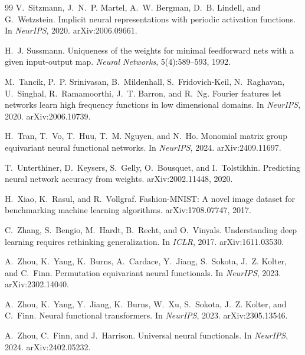 \documentclass[10pt,twocolumn,letterpaper]{article}
\theoremstyle{definition}
\begin{document}
\begin{thebibliography}{99}
V.~Sitzmann, J.~N.~P. Martel, A.~W. Bergman, D.~B. Lindell, and G.~Wetzstein.
\newblock Implicit neural representations with periodic activation functions.
\newblock In \emph{NeurIPS}, 2020. arXiv:2006.09661.

H.~J. Sussmann.
\newblock Uniqueness of the weights for minimal feedforward nets with a given input-output map.
\newblock \emph{Neural Networks}, 5(4):589--593, 1992.

M.~Tancik, P.~P. Srinivasan, B.~Mildenhall, S.~Fridovich-Keil, N.~Raghavan, U.~Singhal,
R.~Ramamoorthi, J.~T. Barron, and R.~Ng.
\newblock Fourier features let networks learn high frequency functions in low dimensional domains.
\newblock In \emph{NeurIPS}, 2020. arXiv:2006.10739.

H.~Tran, T.~Vo, T.~Huu, T.~M. Nguyen, and N.~Ho.
\newblock Monomial matrix group equivariant neural functional networks.
\newblock In \emph{NeurIPS}, 2024. arXiv:2409.11697.

T.~Unterthiner, D.~Keysers, S.~Gelly, O.~Bousquet, and I.~Tolstikhin.
\newblock Predicting neural network accuracy from weights.
\newblock arXiv:2002.11448, 2020.

H.~Xiao, K.~Rasul, and R.~Vollgraf.
\newblock Fashion-MNIST: A novel image dataset for benchmarking machine learning algorithms.
\newblock arXiv:1708.07747, 2017.

C.~Zhang, S.~Bengio, M.~Hardt, B.~Recht, and O.~Vinyals.
\newblock Understanding deep learning requires rethinking generalization.
\newblock In \emph{ICLR}, 2017. arXiv:1611.03530.

A.~Zhou, K.~Yang, K.~Burns, A.~Cardace, Y.~Jiang, S.~Sokota, J.~Z. Kolter, and C.~Finn.
\newblock Permutation equivariant neural functionals.
\newblock In \emph{NeurIPS}, 2023. arXiv:2302.14040.

A.~Zhou, K.~Yang, Y.~Jiang, K.~Burns, W.~Xu, S.~Sokota, J.~Z. Kolter, and C.~Finn.
\newblock Neural functional transformers.
\newblock In \emph{NeurIPS}, 2023. arXiv:2305.13546.

A.~Zhou, C.~Finn, and J.~Harrison.
\newblock Universal neural functionals.
\newblock In \emph{NeurIPS}, 2024. arXiv:2402.05232.

\end{thebibliography}
\end{document}
